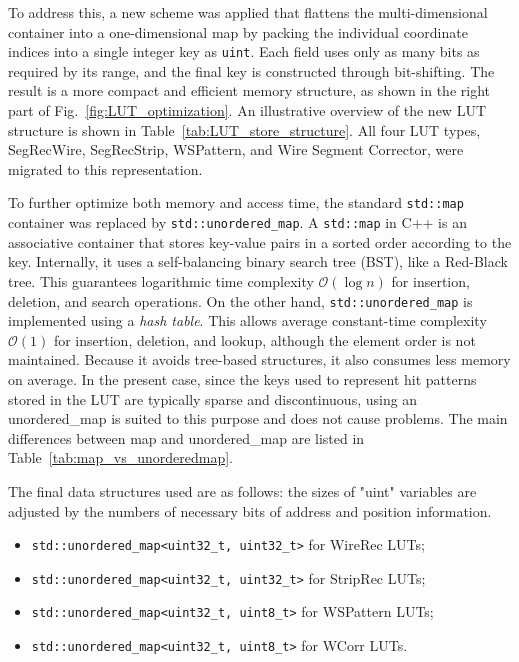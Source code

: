 To address this, a new scheme was applied that flattens the multi-dimensional container into a one-dimensional map by packing the individual coordinate indices into a single integer key as \texttt{uint}. Each field uses only as many bits as required by its range, and the final key is constructed through bit-shifting. The result is a more compact and efficient memory structure, as shown in the right part of Fig.~\ref{fig:LUT_optimization}. An illustrative overview of the new LUT structure is shown in Table~\ref{tab:LUT_store_structure}. All four LUT types, SegRecWire, SegRecStrip, WSPattern, and Wire Segment Corrector, were migrated to this representation.


To further optimize both memory and access time, the standard \texttt{std::map} container was replaced by \texttt{std::unordered\_map}. A \texttt{std::map} in C++ is an associative container that stores key-value pairs in a sorted order according to the key. Internally, it uses a self-balancing binary search tree (BST), like a Red-Black tree. This guarantees logarithmic time complexity $\mathcal{O}(\log n)$ for insertion, deletion, and search operations. On the other hand, \texttt{std::unordered\_map} is implemented using a \textit{hash table}. This allows average constant-time complexity $\mathcal{O}(1)$ for insertion, deletion, and lookup, although the element order is not maintained. Because it avoids tree-based structures, it also consumes less memory on average. In the present case, since the keys used to represent hit patterns stored in the LUT are typically sparse and discontinuous, using an unordered\_map is suited to this purpose and does not cause problems. The main differences between map and unordered\_map are listed in Table~\ref{tab:map_vs_unorderedmap}.


The final data structures used are as follows: the sizes of "uint" variables are adjusted by the numbers of necessary bits of address and position information.
\begin{itemize}
  \item \texttt{std::unordered\_map<uint32\_t, uint32\_t>} for WireRec LUTs;
  \item \texttt{std::unordered\_map<uint32\_t, uint32\_t>} for StripRec LUTs;
  \item \texttt{std::unordered\_map<uint32\_t, uint8\_t>}  for WSPattern LUTs;
  \item \texttt{std::unordered\_map<uint32\_t, uint8\_t>}  for WCorr LUTs.
\end{itemize}

